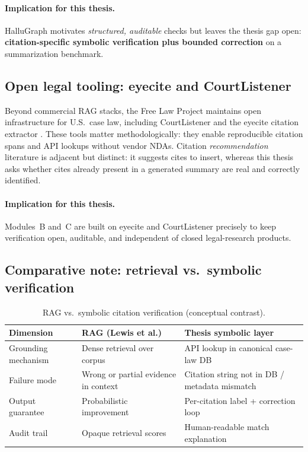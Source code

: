 \paragraph{Implication for this thesis.}
HalluGraph motivates \emph{structured, auditable} checks but leaves the thesis gap open: \textbf{citation-specific symbolic verification plus bounded correction} on a summarization benchmark.

\subsection{Open legal tooling: eyecite and CourtListener}
\label{sec:lit-eyecite-cl}

Beyond commercial RAG stacks, the Free Law Project maintains open infrastructure for U.S.\ case law, including CourtListener and the eyecite citation extractor \cite{freelawproject,courtlistener_api,eyecite2021}. These tools matter methodologically: they enable reproducible citation spans and API lookups without vendor NDAs. Citation \emph{recommendation} literature \cite{farber2020citation} is adjacent but distinct: it suggests cites to insert, whereas this thesis asks whether cites already present in a generated summary are real and correctly identified.

\paragraph{Implication for this thesis.}
Modules~B and~C are built on eyecite and CourtListener precisely to keep verification open, auditable, and independent of closed legal-research products.

\subsection{Comparative note: retrieval vs.\ symbolic verification}

\begin{table}[!t]
\centering
\caption{RAG vs.\ symbolic citation verification (conceptual contrast).}
\label{tab:rag-vs-symbolic}
\begin{tabular}{@{}p{3.2cm}p{5.2cm}p{5.6cm}@{}}
\toprule
\textbf{Dimension} & \textbf{RAG (Lewis et al.)} & \textbf{Thesis symbolic layer} \\
\midrule
Grounding mechanism & Dense retrieval over corpus & API lookup in canonical case-law DB \\
Failure mode & Wrong or partial evidence in context & Citation string not in DB / metadata mismatch \\
Output guarantee & Probabilistic improvement & Per-citation label + correction loop \\
Audit trail & Opaque retrieval scores & Human-readable match explanation \\
\bottomrule
\end{tabular}
\end{table}

